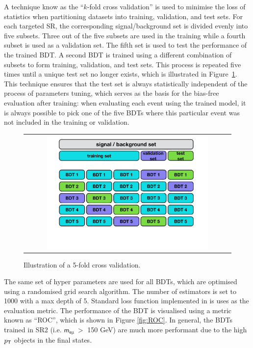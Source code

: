 A technique know as the ``$k$-fold cross validation'' is used to minimise the loss of statistics when partitioning datasets into training, validation, and test sets. For each targeted \ac{SR}, the corresponding signal/background set is divided evenly into five subsets. Three out of the five subsets are used in the training while a fourth subset is used as a validation set. The fifth set is used to test the performance of the trained \ac{BDT}. A second \ac{BDT} is trained using a different combination of subsets to form training, validation, and test sets. This process is repeated five times until a unique test set no longer exists, which is illustrated in Figure~\ref{fig:5fold}. This technique ensures that the test set is always statistically independent of the process of parameters tuning, which serves as the basis for the bias-free evaluation after training: when evaluating each event using the trained model, it is always possible to pick one of the five \acp{BDT} where this particular event was not included in the training or validation.

\begin{figure}[tbh!]
 \begin{center}
   \caption{Illustration of a 5-fold cross validation.}
 \begin{tabular}{c}
  \includegraphics[width=0.8\textwidth]{figures/Part3/BDT/kfold}
 \end{tabular}
 \label{fig:5fold}
 \end{center}
\end{figure}

The same set of hyper parameters are used for all \acp{BDT}, which are optimised using a randomised grid search algorithm. The number of estimators is set to 1000 with a max depth of 5. Standard loss function implemented in \cite{Chen:2016:XST:2939672.2939785} is uses as the evaluation metric. The performance of the \ac{BDT} is visualised using a metric known as ``\ac{ROC}'', which is shown in Figure \ref{fig:ROC}. In general, the \acp{BDT} trained in  \ac{SR}2 (i.e. $\textsf{m}_{\textsf{e}\upmu}~>$ 150 GeV) are much more performant due to the high $p_{\textsf{T}}$ objects in the final states.

